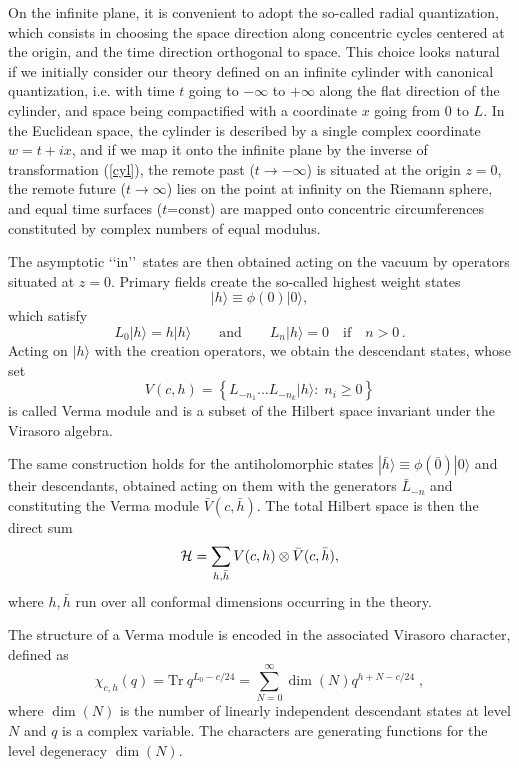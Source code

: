 \documentclass[a4paper,12pt]{report}
\begin{document}
On the infinite plane, it is convenient to adopt the so-called radial quantization, which consists in choosing
the space direction along concentric cycles centered at the origin, and the time direction orthogonal to space.
This choice looks natural if we initially consider our theory defined on an infinite cylinder with canonical
quantization, i.e. with time $t$ going to $-\infty$ to $+\infty$ along the flat direction of the cylinder, and
space being compactified with a coordinate $x$ going from $0$ to $L$. In the Euclidean space, the cylinder is
described by a single complex coordinate $w=t+ix$, and if we map it onto the infinite plane by the inverse of
transformation (\ref{cyl}), the remote past ($t\rightarrow -\infty$) is situated at the origin $z=0$, the remote
future ($t\rightarrow \infty$) lies on the point at infinity on the Riemann sphere, and equal time surfaces
($t$=const) are mapped onto concentric circumferences constituted by complex numbers of equal modulus.

The asymptotic \lq\lq in\rq\rq\, states are then obtained acting on the vacuum by operators situated at $z=0$.
Primary fields create the so-called highest weight states
\begin{equation}\label{hwst}
|h\rangle\equiv \phi(0)|0\rangle,
\end{equation}
which satisfy
\begin{equation}
L_{0}|h\rangle=h|h\rangle\qquad\textrm{and}\qquad L_{n}|h\rangle=0\quad\textrm{if}\quad n>0 \,.
\end{equation}
Acting on $|h\rangle$ with the creation operators, we obtain the descendant states, whose set
\begin{equation}\label{verma}
V(c,h)=\left\{L_{-n_{1}}...L_{-n_{k}}|h\rangle:\;n_{i}\geq 0\right\}
\end{equation}
is called Verma module and is a subset of the Hilbert space invariant under the Virasoro algebra.

The same construction holds for the antiholomorphic states $|\bar{h}\rangle\equiv \phi(\bar{0})|0\rangle$ and
their descendants, obtained acting on them with the generators $\bar{L}_{-n}$ and constituting the Verma module
$\bar{V}(c,\bar{h})$. The total Hilbert space is then the direct sum
\begin{equation}\label{hilbert}
{\cal H}=\sum_{h,\bar{h}}V(c,h)\otimes \bar{V}(c,\bar{h}),
\end{equation}
where $h,\bar{h}$ run over all conformal dimensions occurring in the theory.

The structure of a Verma module is encoded in the associated Virasoro character, defined as
\begin{equation}\label{char}
\chi _{c,h }(q)=\textrm{Tr}\:q^{L_{0}-c/24}=\sum_{N =0}^{\infty }\dim (N )q^{h +N -c/24}\;,
\end{equation}
where $\dim (N)$ is the number of linearly independent descendant states at level $N$ and $q$ is a complex
variable. The characters are generating functions for the level degeneracy $\dim (N)$.
\end{document}
